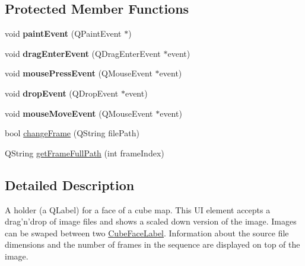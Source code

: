 \subsection*{\-Protected \-Member \-Functions}
\begin{DoxyCompactItemize}
\item 
\hypertarget{class_cube_face_label_a6c2c25a1616d630255eacc6bab8b8b82}{
void {\bfseries paint\-Event} (\-Q\-Paint\-Event $\ast$)}
\label{class_cube_face_label_a6c2c25a1616d630255eacc6bab8b8b82}

\item 
\hypertarget{class_cube_face_label_a220a2129941db0b18b8bacffbda4feb0}{
void {\bfseries drag\-Enter\-Event} (\-Q\-Drag\-Enter\-Event $\ast$event)}
\label{class_cube_face_label_a220a2129941db0b18b8bacffbda4feb0}

\item 
\hypertarget{class_cube_face_label_a6c9dfc7b9a3a44492b273f93028ffdeb}{
void {\bfseries mouse\-Press\-Event} (\-Q\-Mouse\-Event $\ast$event)}
\label{class_cube_face_label_a6c9dfc7b9a3a44492b273f93028ffdeb}

\item 
\hypertarget{class_cube_face_label_a0cb00bb33f167763b1136cb8f6cac011}{
void {\bfseries drop\-Event} (\-Q\-Drop\-Event $\ast$event)}
\label{class_cube_face_label_a0cb00bb33f167763b1136cb8f6cac011}

\item 
\hypertarget{class_cube_face_label_aad09c3631a93547c4052c8d615f9f161}{
void {\bfseries mouse\-Move\-Event} (\-Q\-Mouse\-Event $\ast$event)}
\label{class_cube_face_label_aad09c3631a93547c4052c8d615f9f161}

\item 
bool \hyperlink{class_cube_face_label_a8dba7feda537bf5e3a02ce50b87151a4}{change\-Frame} (\-Q\-String file\-Path)
\item 
\-Q\-String \hyperlink{class_cube_face_label_adaac9b4e28e38c0ffb17e83181b9c2b9}{get\-Frame\-Full\-Path} (int frame\-Index)
\end{DoxyCompactItemize}


\subsection{\-Detailed \-Description}
\-A holder (a \-Q\-Label) for a face of a cube map. \-This \-U\-I element accepts a drag'n'drop of image files and shows a scaled down version of the image. \-Images can be swaped between two \hyperlink{class_cube_face_label}{\-Cube\-Face\-Label}. \-Information about the source file dimensions and the number of frames in the sequence are displayed on top of the image. 

